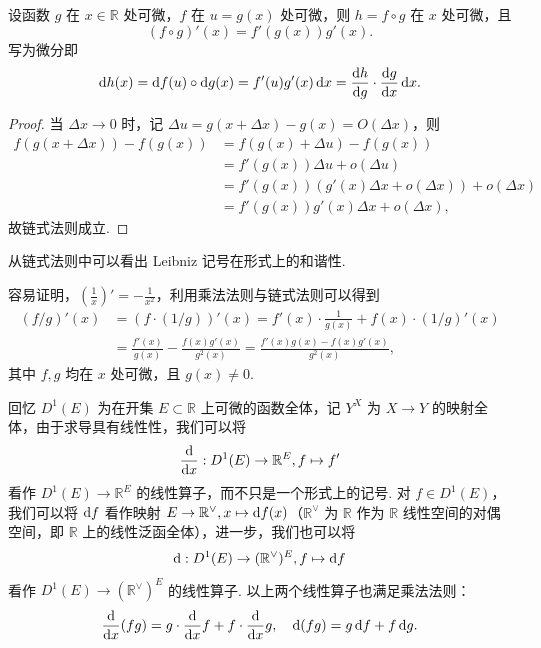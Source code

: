 \documentclass[../main.tex]{subfiles}
\begin{document}
\begin{proposition}[链式法则] 
    设函数 $g$ 在 $x \in \mathbb R$ 处可微，$f$ 在 $u = g(x)$ 处可微，则 $h = f \circ g$ 在 $x$ 处可微，且 
    $$
    (f \circ g)'(x) = f'(g(x)) g'(x). 
    $$
    写为微分即
    $$
    \mathrm{d} h(x) = \mathrm{d} f(u) \circ \mathrm{d} g(x) = f'(u) g'(x) \,\mathrm{d} x = \frac{\mathrm{d} h}{\mathrm{d} g} \cdot \frac{\mathrm{d} g}{\mathrm{d} x} \,\mathrm{d} x. 
    $$
\end{proposition}

\begin{proof}
    当 $\Delta x \to 0$ 时，记 $\Delta u = g(x + \Delta x) - g(x) = O(\Delta x)$，则
    \begin{align*}
        f(g(x + \Delta x)) - f(g(x)) &= f(g(x) + \Delta u) - f(g(x)) \\
        &= f'(g(x)) \Delta u + o(\Delta u) \\
        &= f'(g(x)) (g'(x) \Delta x + o(\Delta x)) + o(\Delta x) \\
        &= f'(g(x)) g'(x) \Delta x + o(\Delta x), 
    \end{align*}
    故链式法则成立. 
\end{proof}

从链式法则中可以看出 Leibniz 记号在形式上的和谐性. 

容易证明，$(\frac{1}{x})' = -\frac{1}{x^2}$，利用乘法法则与链式法则可以得到
\begin{align*}
    (f / g)'(x) &= (f \cdot (1 / g))'(x) = f'(x) \cdot \frac{1}{g(x)} + f(x) \cdot (1 / g)'(x) \\
    &= \frac{f'(x)}{g(x)} - \frac{f(x) g'(x)}{g^2(x)} = \frac{f'(x) g(x) - f(x) g'(x)}{g^2(x)}, 
\end{align*}
其中 $f, g$ 均在 $x$ 处可微，且 $g(x) \neq 0$. 

回忆 $D^1(E)$ 为在开集 $E \subset \mathbb R$ 上可微的函数全体，记 $Y^X$ 为 $X \to Y$ 的映射全体，由于求导具有线性性，我们可以将
$$
\frac{\mathrm{d}}{\mathrm{d} x}:D^1(E) \to \mathbb R^E, f \mapsto f'
$$
看作 $D^1(E) \to \mathbb R^E$ 的线性算子，而不只是一个形式上的记号. 对 $f \in D^1(E)$，我们可以将 $\mathrm{d} f$ 看作映射 $E \to \mathbb R^\vee, x \mapsto \mathrm{d} f(x)$（$\mathbb R^\vee$ 为 $\mathbb R$ 作为 $\mathbb R$ 线性空间的对偶空间，即 $\mathbb R$ 上的线性泛函全体），进一步，我们也可以将
$$
\mathrm{d}:D^1(E) \to (\mathbb R^\vee)^E, f \mapsto \mathrm{d} f
$$
看作 $D^1(E) \to (\mathbb R^\vee)^E$ 的线性算子. 以上两个线性算子也满足乘法法则：
\begin{equation*}
    \frac{\mathrm{d}}{\mathrm{d} x}(fg) = g \cdot \frac{\mathrm{d}}{\mathrm{d} x} f + f \cdot \frac{\mathrm{d}}{\mathrm{d} x} g, \quad \mathrm{d}(fg) = g \,\mathrm{d} f + f \,\mathrm{d} g. 
\end{equation*}
\end{document}
